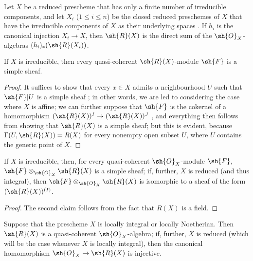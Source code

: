 \begin{corollary}[7.3.4]
\label{I.7.3.4}
Let $X$ be a reduced prescheme that has only a finite number of irreducible components, and let $X_i$ ($1\leq i\leq n$) be the closed reduced preschemes of $X$ that have the irreducible components of $X$ as their underlying spaces .
If $h_i$ is the canonical injection $X_i\to X$, then $\sh{R}(X)$ is the direct sum of the $\sh{O}_X$-algebras $(h_i)_*(\sh{R}(X_i))$.
\end{corollary}

\begin{corollary}[7.3.5]
\label{I.7.3.5}
If $X$ is irreducible, then every quasi-coherent $\sh{R}(X)$-module $\sh{F}$ is a simple sheaf.
\end{corollary}

\begin{proof}
It suffices to show that every $x\in X$ admits a neighbourhood $U$ such that $\sh{F}|U$ is a simple sheaf ; in other words, we are led to considering the case where $X$ is affine; we can further suppose that $\sh{F}$ is the cokernel of a homomorphism $(\sh{R}(X))^{I}\to(\sh{R}(X))^{J}$ , and everything then follows from showing that $\sh{R}(X)$ is a simple sheaf; but this is evident, because $\Gamma(U,\sh{R}(X))=R(X)$ for every nonempty open subset $U$, where $U$ contains the generic point of $X$.
\end{proof}

\begin{corollary}[7.3.6]
\label{I.7.3.6}
If $X$ is irreducible, then, for every quasi-coherent $\sh{O}_X$-module $\sh{F}$, $\sh{F}\otimes_{\sh{O}_X}\sh{R}(X)$ is a simple sheaf; if, further, $X$ is reduced (and thus integral), then $\sh{F}\otimes_{\sh{O}_X}\sh{R}(X)$ is isomorphic to a sheaf of the form $(\sh{R}(X))^{(I)}$.
\end{corollary}

\begin{proof}
The second claim follows from the fact that $R(X)$ is a field.
\end{proof}

\begin{proposition}[7.3.7]
\label{I.7.3.7}
Suppose that the prescheme $X$ is locally integral or locally Noetherian.
Then $\sh{R}(X)$ is a quasi-coherent $\sh{O}_X$-algebra; if, further, $X$ is reduced (which will be the case whenever $X$ is locally integral), then the canonical homomorphism $\sh{O}_X\to\sh{R}(X)$ is injective.
\end{proposition}

